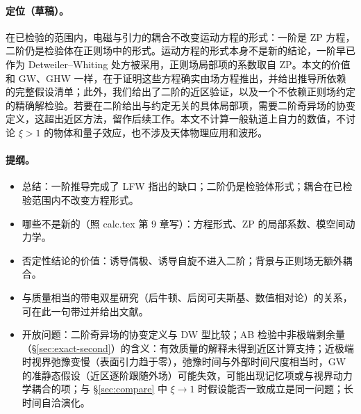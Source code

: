 \documentclass[11pt,a4paper]{ctexart}
\begin{document}
\paragraph{定位（草稿）。}在已检验的范围内，电磁与引力的耦合不改变运动方程的形式：一阶是 ZP 方程，二阶仍是检验体在正则场中的形式。运动方程的形式本身不是新的结论，一阶早已作为 Detweiler--Whiting 处方被采用，正则场局部项的系数取自 ZP。本文的价值和 GW、GHW 一样，在于证明这些方程确实由场方程推出，并给出推导所依赖的完整假设清单；此外，我们给出了二阶的近区验证，以及一个不依赖正则场约定的精确解检验。若要在二阶给出与约定无关的具体局部项，需要二阶奇异场的协变定义，这超出近区方法，留作后续工作。本文不计算一般轨道上自力的数值，不讨论 $\xi>1$ 的物体和量子效应，也不涉及天体物理应用和波形。

\paragraph{提纲。}
\begin{itemize}[nosep]
\item 总结：一阶推导完成了 LFW 指出的缺口；二阶仍是检验体形式；耦合在已检验范围内不改变方程形式。
\item 哪些不是新的（照 calc.tex 第 9 章写）：方程形式、ZP 的局部系数、模空间动力学。
\item 否定性结论的价值：诱导偶极、诱导自旋不进入二阶；背景与正则场无额外耦合。
\item 与质量相当的带电双星研究（后牛顿、后闵可夫斯基、数值相对论）的关系，可在此一句带过并给出文献。
\item 开放问题：二阶奇异场的协变定义与 DW 型比较；AB 检验中非极端剩余量（\S\ref{sec:exact-second}）的含义：有效质量的解释未得到近区计算支持；近极端时视界弛豫变慢（表面引力趋于零），弛豫时间与外部时间尺度相当时，GW 的准静态假设（近区逐阶跟随外场）可能失效，可能出现记忆项或与视界动力学耦合的项；与 \S\ref{sec:compare} 中 $\xi\to1$ 时假设能否一致成立是同一问题；长时间自洽演化。
\end{itemize}

\end{document}
